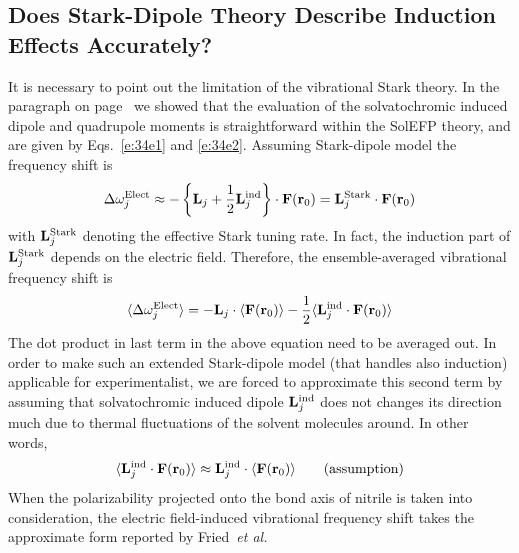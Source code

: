 \documentclass[a4paper,titlepage,twoside,fleqn,12pt]{book}
\begin{document}
\begin{refsection}
\subsection{Does Stark-Dipole Theory Describe Induction Effects Accurately?\label{s:stark-dipole-cn}}

It is necessary to point out the limitation of the
vibrational Stark theory. 
In the paragraph on page~\pageref{p:solindmult} we showed that the
evaluation of the solvatochromic induced dipole and quadrupole moments is
straightforward within the SolEFP theory, and are given by Eqs.~\eqref{e:34e1} and \eqref{e:34e2}.
Assuming Stark\hyp{}dipole model the frequency shift
is
%
\begin{equation} \label{e:dmtp-solmmm-dipole}
 \Delta\omega_j^{\rm Elect} \approx  -
                       \left\{ {\bf L}_j + \frac{1}{2} {\bf L}_j^{\rm ind} \right\} 
                       \cdot {\bf F}({\bf r}_0) = {\bf L}_j^{\rm Stark} \cdot {\bf F}({\bf r}_0)
\end{equation}
%
with ${\bf L}_j^{\rm Stark}$ denoting the effective Stark tuning rate.
In fact, the induction part of ${\bf L}_j^{\rm Stark}$ depends on the electric field.
Therefore, the ensemble\hyp{}averaged vibrational frequency shift
is
%
\begin{equation} 
 \langle \Delta\omega_j^{\rm Elect} \rangle =  -
                        {\bf L}_j  \cdot  \langle  {\bf F}({\bf r}_0) \rangle 
                     - \frac{1}{2} \langle {\bf L}_j^{\rm ind}  \cdot {\bf F}({\bf r}_0) \rangle
\end{equation}
%
The dot product in last term in the above equation need to be averaged out.
In order to make such an extended Stark\hyp{}dipole model (that handles also induction)
applicable for experimentalist, we are forced to approximate this second term
by assuming that solvatochromic induced dipole ${\bf L}_j^{\rm ind}$ does not
changes its direction much due to thermal fluctuations of the solvent molecules around.
In other words,
%
\begin{equation} \label{e:dmtp-solmmm-dipole-assumption} 
\langle {\bf L}_j^{\rm ind}  \cdot {\bf F}({\bf r}_0) \rangle \approx 
{\bf L}_j^{\rm ind} \cdot  \langle  {\bf F}({\bf r}_0) \rangle 
\qquad \text{(assumption)}
\end{equation}
%
When the polarizability projected onto
the bond axis of nitrile is taken into consideration,
the electric field\hyp{}induced vibrational frequency
shift takes the approximate form reported by 
Fried~\emph{et al.} \citep{Fried.Wang.Boxer.Ren.Pande.JPCB.2013}

\end{refsection}
\end{document}
